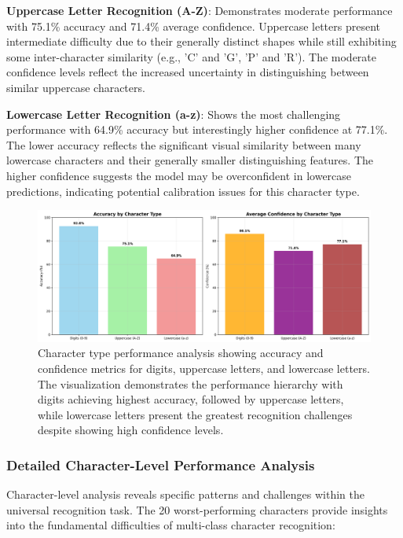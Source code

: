 \documentclass[11pt,a4paper]{report}
\begin{document}
\textbf{Uppercase Letter Recognition (A-Z)}: Demonstrates moderate performance with 75.1\% accuracy and 71.4\% average confidence. Uppercase letters present intermediate difficulty due to their generally distinct shapes while still exhibiting some inter-character similarity (e.g., 'C' and 'G', 'P' and 'R'). The moderate confidence levels reflect the increased uncertainty in distinguishing between similar uppercase characters.

\textbf{Lowercase Letter Recognition (a-z)}: Shows the most challenging performance with 64.9\% accuracy but interestingly higher confidence at 77.1\%. The lower accuracy reflects the significant visual similarity between many lowercase characters and their generally smaller distinguishing features. The higher confidence suggests the model may be overconfident in lowercase predictions, indicating potential calibration issues for this character type.

\begin{figure}[H]
\centering
\includegraphics[width=\textwidth]{character_type_performance.png}
\caption{Character type performance analysis showing accuracy and confidence metrics for digits, uppercase letters, and lowercase letters. The visualization demonstrates the performance hierarchy with digits achieving highest accuracy, followed by uppercase letters, while lowercase letters present the greatest recognition challenges despite showing high confidence levels.}
\label{fig:character_type_performance}
\end{figure}

\subsubsection{Detailed Character-Level Performance Analysis}

Character-level analysis reveals specific patterns and challenges within the universal recognition task. The 20 worst-performing characters provide insights into the fundamental difficulties of multi-class character recognition:
\end{document}
